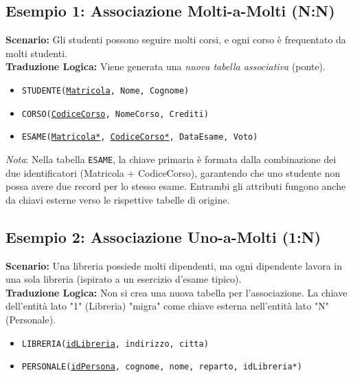 \subsection{Esempio 1: Associazione Molti-a-Molti (N:N)}
\textbf{Scenario:} Gli studenti possono seguire molti corsi, e ogni corso è frequentato da molti studenti.
\\[0.1cm]
\textbf{Traduzione Logica:} Viene generata una \textit{nuova tabella associativa} (ponte).
\begin{itemize}
    \item \texttt{STUDENTE(\underline{Matricola}, Nome, Cognome)}
    \item \texttt{CORSO(\underline{CodiceCorso}, NomeCorso, Crediti)}
    \item \texttt{ESAME(\underline{Matricola*}, \underline{CodiceCorso*}, DataEsame, Voto)}
\end{itemize}
\textit{Nota}: Nella tabella \texttt{ESAME}, la chiave primaria è formata dalla combinazione dei due identificatori (Matricola + CodiceCorso), garantendo che uno studente non possa avere due record per lo stesso esame. Entrambi gli attributi fungono anche da chiavi esterne verso le rispettive tabelle di origine.

\subsection{Esempio 2: Associazione Uno-a-Molti (1:N)}
\textbf{Scenario:} Una libreria possiede molti dipendenti, ma ogni dipendente lavora in una sola libreria (ispirato a un esercizio d'esame tipico).
\\[0.1cm]
\textbf{Traduzione Logica:} Non si crea una nuova tabella per l'associazione. La chiave dell'entità lato "1" (Libreria) "migra" come chiave esterna nell'entità lato "N" (Personale).
\begin{itemize}
    \item \texttt{LIBRERIA(\underline{idLibreria}, indirizzo, citta)}
    \item \texttt{PERSONALE(\underline{idPersona}, cognome, nome, reparto, idLibreria*)}
\end{itemize}

